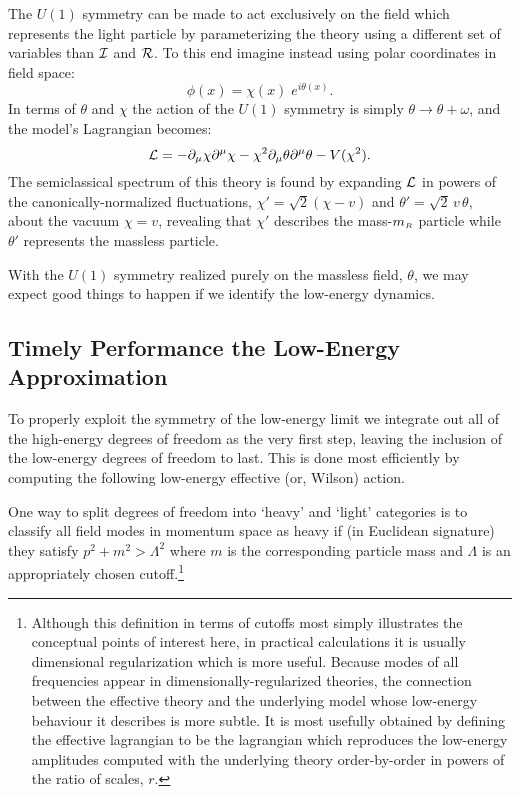 The $U(1)$ symmetry can be made to act exclusively
on the field which represents the light particle
by parameterizing the theory using a different set of variables
than ${\cal I}$ and ${\cal R}$. 
To this end imagine instead using polar coordinates in field space:
%
\begin{equation}
\label{polcoords}
\phi(x) = \chi(x) \; e^{i \theta(x)} .
\end{equation}
%
In terms of $\theta$ and $\chi$ the action of the 
$U(1)$ symmetry is simply $\theta \to \theta + \omega$, 
and the model's Lagrangian becomes: 
%
\begin{equation}
\label{linpolcoords}
{\cal L} = - \partial_\mu \chi \partial^\mu \chi - \chi^2 \partial_\mu \theta
\partial^\mu \theta - V(\chi^2).
\end{equation}
%
The semiclassical spectrum of this theory is found by expanding
${\cal L}$ in powers of the canonically-normalized
fluctuations, $\chi' = \sqrt2 (\chi - v)$ and $\theta'
= \sqrt2 \, v \, \theta$, about the vacuum $\chi = v$, revealing
that $\chi'$ describes the mass-$m_{\scriptscriptstyle R}$ particle while
$\theta'$ represents the massless particle. 

With the $U(1)$ symmetry realized purely on the massless
field, $\theta$, we may expect good things to happen if we
identify the low-energy dynamics. 

\subsection{Timely Performance the Low-Energy Approximation}

To properly exploit the symmetry of the low-energy limit we
integrate out all of the high-energy degrees of freedom as the
very first step, leaving the inclusion of the low-energy degrees
of freedom to last. This is done most efficiently by computing
the following low-energy effective (or, Wilson) action. 

One way to split degrees of freedom into `heavy' and `light'
categories is to classify all field modes in momentum
space as heavy if (in Euclidean signature) 
they satisfy $p^2 + m^2 > \Lambda^2$ where $m$ is the
corresponding particle mass and $\Lambda$ is an 
appropriately chosen cutoff.\footnote{Although this
definition in terms of cutoffs most simply illustrates
the conceptual points of interest here, in practical calculations
it is usually dimensional regularization which is more
useful. Because modes of all frequencies appear in
dimensionally-regularized theories, the connection between
the effective theory and the underlying model whose low-energy
behaviour it describes is more subtle. It is most usefully
obtained by defining the effective lagrangian to be the
lagrangian which reproduces the low-energy 
amplitudes computed with the underlying theory order-by-order
in powers of the ratio of scales, 
$r$.\cite{Burgess95,ETbooks,ETreviews}} 

